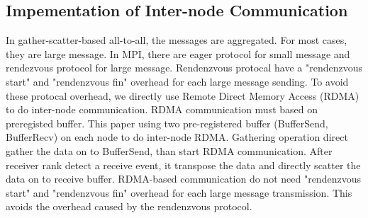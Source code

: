 \subsection {Impementation of Inter-node Communication}

In gather-scatter-based all-to-all, the messages are aggregated. 
For most cases, they are large message.
In MPI, there are  eager protocol for small message and rendezvous protocol for large message.
Rendenzvous protocal have a "rendenzvous start" and "rendenzvous fin" overhead for each large message sending.
To avoid these protocal overhead, we directly use Remote Direct Memory Access (RDMA) to do inter-node communication.
RDMA communication must based on preregisted buffer.
This paper using two pre-registered buffer (BufferSend, BufferRecv) on each node to do inter-node RDMA.
Gathering operation direct gather the data on to BufferSend, than start RDMA communication. 
After receiver rank detect a receive event, it transpose the data and directly scatter the data on to receive buffer.
RDMA-based communication do not need  "rendenzvous start" and "rendenzvous fin" overhead for each large message transmission.
This avoids the overhead caused by the rendenzvous protocol.